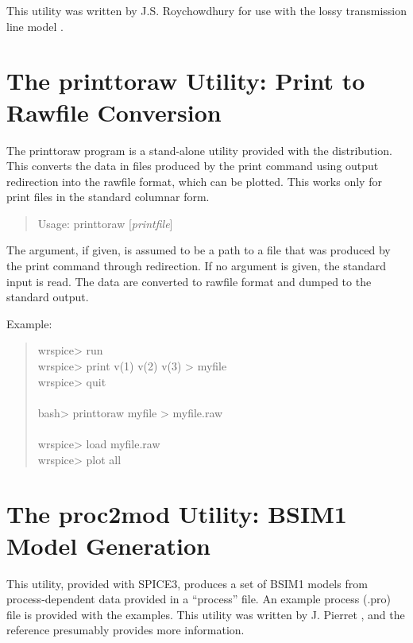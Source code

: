 This utility was written by J.S.  Roychowdhury for use with the lossy
transmission line model \cite{ltra}.


\section{The {\vt printtoraw} Utility: Print to Rawfile Conversion}


The {\vt printtoraw} program is a stand-alone utility provided with
the {\WRspice} distribution.  This converts the data in files produced
by the {\et print} command using output redirection into the rawfile
format, which can be plotted.  This works only for print files in the
standard columnar form.

\begin{quote}
Usage: {\vt printtoraw} [{\it printfile\/}]
\end{quote}

The argument, if given, is assumed to be a path to a file that was
produced by the {\WRspice} {\et print} command through redirection. 
If no argument is given, the standard input is read.  The data are
converted to rawfile format and dumped to the standard output.

Example:
\begin{quote}
{\vt wrspice> run}\\
{\vt wrspice> print v(1) v(2) v(3) > myfile}\\
{\vt wrspice> quit}\\
\\
{\vt bash> printtoraw myfile > myfile.raw}\\
\\
{\vt wrspice> load myfile.raw}\\
{\vt wrspice> plot all}
\end{quote}


\section{The {\vt proc2mod} Utility: BSIM1 Model Generation}


This utility, provided with SPICE3, produces a set of BSIM1 models
from process-dependent data provided in a ``process'' file.  An
example process ({\vt .pro}) file is provided with the {\WRspice}
examples.  This utility was written by J.  Pierret \cite{pierret},
and the reference presumably provides more information.


